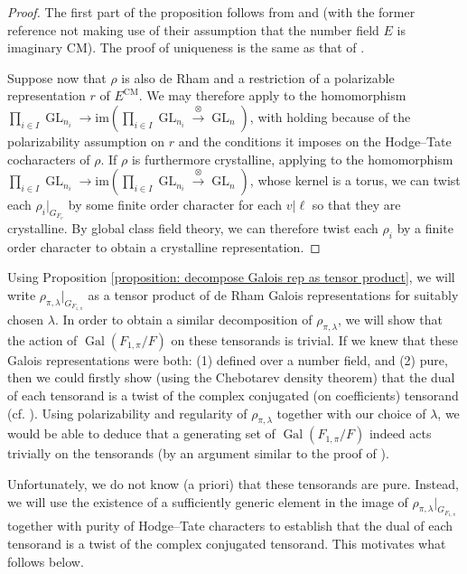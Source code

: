 \documentclass{amsart}
\theoremstyle{definition}
\numberwithin{equation}{section} %
\newcommand{\GL}{\operatorname{GL}}
\newcommand{\Gal}{\operatorname{Gal}}
\begin{document}
\begin{proof}
The first part of the proposition follows from \cite[Lemma 3.2.13]{CEG22} and \cite[Proposition 5.3]{Conrad11} (with the former reference not making use of their assumption that the number field $E$ is imaginary CM).
The proof of uniqueness is the same as that of \cite[Lemma 3.2.14]{CEG22}.

Suppose now that $\rho$ is also de Rham and a restriction of a polarizable representation $r$ of $E^{\mathrm{CM}}$.
We may therefore apply \cite[Theorem 3.2.10]{patrikis2019variations} to the homomorphism $\prod_{i \in I} \GL_{n_i} \to \mathrm{im}(\prod_{i \in I} \GL_{n_i} \xrightarrow{\otimes} \GL_n)$, with \cite[Hypothesis 3.2.4]{patrikis2019variations} holding because of the polarizability assumption on $r$ and the conditions it imposes on the Hodge--Tate cocharacters of $\rho$.
If $\rho$ is furthermore crystalline, applying \cite[Proposition 6.5]{Conrad11} to the homomorphism $\prod_{i \in I} \GL_{n_i} \to \mathrm{im}(\prod_{i \in I} \GL_{n_i} \xrightarrow{\otimes} \GL_n)$, whose kernel is a torus, we can twist each $\rho_i|_{G_{F_v}}$ by some finite order character for each $v|\ell$ so that they are crystalline.
By global class field theory, we can therefore twist each $\rho_i$ by a finite order character to obtain a crystalline representation.
\end{proof}

Using Proposition \ref{proposition: decompose Galois rep as tensor product}, we will write $\rho_{\pi,\lambda}|_{G_{F_{1,\pi}}}$ as a tensor product of de Rham Galois representations for suitably chosen $\lambda$.
In order to obtain a similar decomposition of $\rho_{\pi,\lambda}$, we will show that the action of $\Gal(F_{1,\pi}/F)$ on these tensorands is trivial.
If we knew that these Galois representations were both: (1) defined over a number field, and (2) pure, then we could firstly show (using the Chebotarev density theorem) that the dual of each tensorand is a twist of the complex conjugated (on coefficients) tensorand (cf. \cite[Lemma 1.2(1)]{PatTay15}).
Using polarizability and regularity of $\rho_{\pi,\lambda}$ together with our choice of $\lambda$, we would be able to deduce that a generating set of $\Gal(F_{1,\pi}/F)$ indeed acts trivially on the tensorands (by an argument similar to the proof of \cite[Proposition 4]{Xia19}).

Unfortunately, we do not know (a priori) that these tensorands are pure.
Instead, we will use the existence of a sufficiently generic element in the image of $\rho_{\pi,\lambda}|_{G_{F_{1,\pi}}}$ together with purity of Hodge--Tate characters to establish that the dual of each tensorand is a twist of the complex conjugated tensorand.
This motivates what follows below.
\end{document}
